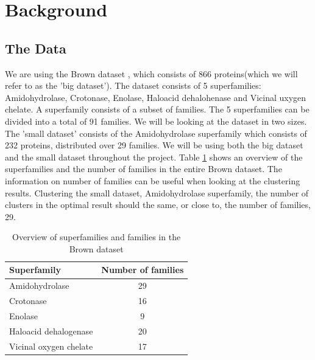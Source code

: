 \documentclass[a4paper,10pt]{article}
\theoremstyle{plain}
\theoremstyle{definition}
\begin{document}
\newpage
\section{Background}

\subsection{The Data}
We are using the Brown dataset \cite{brown}, which consists of 866 proteins(which we will refer to as the 'big dataset'). The dataset consists of 5 superfamilies: Amidohydrolase, Crotonase, Enolase, Haloacid dehalohenase and Vicinal uxygen chelate. A superfamily consists of a subset of families. The 5 superfamilies can be divided into a total of 91 families. We will be looking at the dataset in two sizes. The 'small dataset' consists of the Amidohydrolase superfamily which consists of 232 proteins, distributed over 29 families. We will be using both the big dataset and the small dataset throughout the project. Table \ref{brownTable} shows an overview of the superfamilies and the number of families in the entire Brown dataset. The information on number of families can be useful when looking at the clustering results. Clustering the small dataset, Amidohydrolase superfamily, the number of clusters in the optimal result should the same, or close to, the number of families, 29.

\begin{table}[]
	\centering
	\begin{tabular}{|l|c|}
		\hline
		Superfamily & Number of families \\\hline
		Amidohydrolase & 29 \\\hline
		Crotonase & 16 \\\hline
		Enolase & 9 \\\hline
		Haloacid dehalogenase & 20 \\\hline
		Vicinal oxygen chelate & 17 \\\hline
	\end{tabular}
	\caption{Overview of superfamilies and families in the Brown dataset}
	\label{brownTable}
\end{table}
\end{document}
